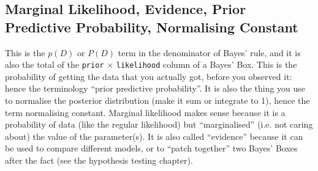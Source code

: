 \subsection*{Marginal Likelihood, Evidence, Prior Predictive Probability, Normalising
Constant}
This is the $p(D)$ or $P(D)$ term in the denominator of Bayes' rule,
and it is also the total of the {\tt prior} $\times$ {\tt likelihood} column
of a Bayes' Box. This is the probability of getting the data that you actually got,
before you observed it: hence the terminology ``prior predictive probability''.
It is also the thing you use to normalise the posterior distribution (make it sum
or integrate to 1), hence the term normalising constant. Marginal likelihood makes
sense because it is a probability of data (like the regular likelihood) but
``marginalised'' (i.e. not caring about) the value of the parameter(s). It is
also called ``evidence'' because it can be used to compare different models, or
to ``patch together'' two Bayes' Boxes after the fact (see the hypothesis testing
chapter).

